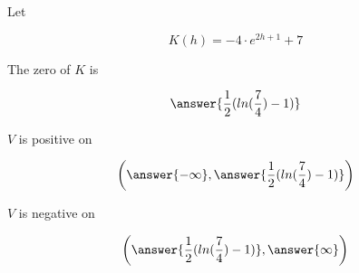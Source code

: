 \documentclass{ximera}
\author{Lee Wayand}
\begin{document}
\begin{exercise}





Let 


\[
K(h) = -4 \cdot e^{2h + 1} +7
\]





\begin{question}



The zero of $K$ is


\[
\answer{\frac{1}{2} (ln(\frac{7}{4}) - 1)}
\]


\end{question}









\begin{question}



$V$ is positive on 


\[
\left( \answer{-\infty}, \answer{\frac{1}{2} (ln(\frac{7}{4}) - 1)}  \right)
\]


\end{question}








\begin{question}



$V$ is negative on 


\[
\left( \answer{\frac{1}{2} (ln(\frac{7}{4}) - 1)}, \answer{\infty}  \right)
\]


\end{question}









\end{exercise}
\end{document}

